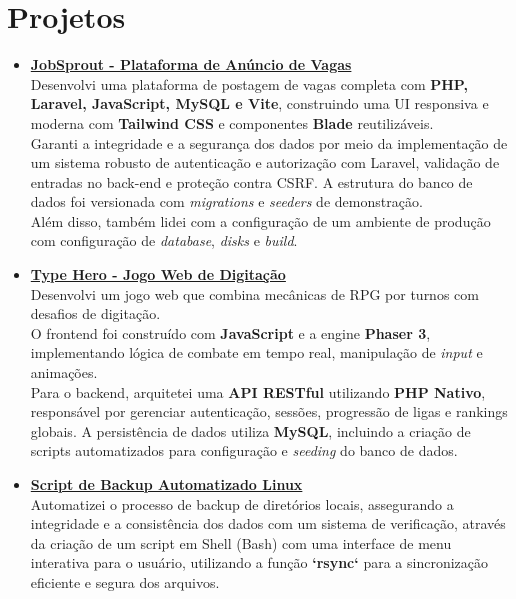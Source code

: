 \documentclass[a4paper,12pt]{article}
\begin{document}
\section*{Projetos}
\begin{itemize}[noitemsep, nolistsep, leftmargin=*, itemsep=8pt]
    
    \item 
        \href{https://github.com/nicolas-mendes/JobSprout}{\raisebox{-0.05\height}\faGithub \textbf{ JobSprout - Plataforma de Anúncio de Vagas}} \\
        Desenvolvi uma plataforma de postagem de vagas completa com \textbf{PHP, Laravel, JavaScript, MySQL e Vite}, construindo uma UI responsiva e moderna com \textbf{Tailwind CSS} e componentes \textbf{Blade} reutilizáveis. \\ 
        Garanti a integridade e a segurança dos dados por meio da implementação de um sistema robusto de autenticação e autorização com Laravel, validação de entradas no back-end e proteção contra CSRF. A estrutura do banco de dados foi versionada com \textit{migrations} e \textit{seeders} de demonstração. \\ 
        Além disso, também lidei com a configuração de um ambiente de produção com configuração de \textit{database}, \textit{disks} e \textit{build}.

\newpage

    \item 
        \href{https://github.com/nicolas-mendes/type-hero}{\raisebox{-0.05\height}\faGithub \textbf{ Type Hero - Jogo Web de Digitação}} \\
        Desenvolvi um jogo web que combina mecânicas de RPG por turnos com desafios de digitação. \\
        O frontend foi construído com \textbf{JavaScript} e a engine \textbf{Phaser 3}, implementando lógica de combate em tempo real, manipulação de \textit{input} e animações.  \\
        Para o backend, arquitetei uma \textbf{API RESTful} utilizando \textbf{PHP Nativo}, responsável por gerenciar autenticação, sessões, progressão de ligas e rankings globais. 
        A persistência de dados utiliza \textbf{MySQL}, incluindo a criação de scripts automatizados para configuração e \textit{seeding} do banco de dados.

    \item 
        \href{https://github.com/nicolas-mendes/script-backup-linux}{\raisebox{-0.05\height}\faGithub \textbf{ Script de Backup Automatizado Linux}} \\
        Automatizei o processo de backup de diretórios locais, assegurando a integridade e a consistência dos dados com um sistema de verificação, através da criação de um script em Shell (Bash) com uma interface de menu interativa para o usuário, utilizando a função \textbf{`rsync`} para a sincronização eficiente e segura dos arquivos.
        
\end{itemize}
\end{document}
